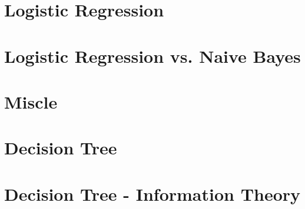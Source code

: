 \documentclass{article}
\begin{document}
   \section{Logistic Regression}



   \section{Logistic Regression vs. Naive Bayes}

  \section{Miscle}
   
\section{Decision Tree}


   \section{Decision Tree - Information Theory}
\end{document}
